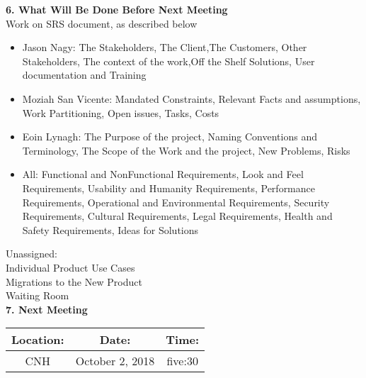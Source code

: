 \documentclass[12pt]{article}
\begin{document}
\begin{flushleft}
\textbf{6. What Will Be Done Before Next Meeting}\\
Work on SRS document, as described below\\
\begin{itemize}
\item Jason Nagy: The Stakeholders, The Client,The Customers, Other Stakeholders, The context of the work,Off the Shelf Solutions, User documentation and Training\\
\item Moziah San Vicente: Mandated Constraints, Relevant Facts and assumptions, Work Partitioning, Open issues, Tasks, Costs\\
\item Eoin Lynagh: The Purpose of the project, Naming Conventions and Terminology, The Scope of the Work and the project, New Problems, Risks\\
\item All: Functional and NonFunctional Requirements, Look and Feel Requirements, Usability and Humanity Requirements, Performance Requirements, Operational and Environmental Requirements, Security Requirements, Cultural Requirements, Legal Requirements, Health and Safety Requirements, Ideas for Solutions
\end{itemize}
Unassigned:\\
Individual Product Use Cases\\
Migrations to the New Product\\
Waiting Room\\


\textbf{7. Next Meeting}\\
\begin{center}
 \begin{tabular}{|c | c | c |}
\hline
 Location: & Date: & Time: \\
 \hline
 CNH & October 2, 2018 & five:30\\
\hline
\end{tabular}
\end{center}

\end{flushleft}
\end{document}
